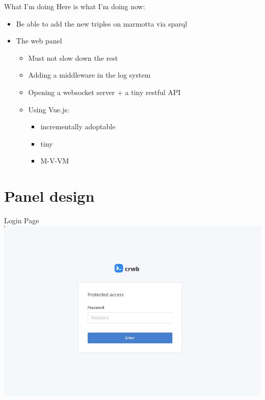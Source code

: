 \documentclass[10pt]{beamer}
\begin{document}
\begin{frame}{What I'm doing}
    Here is what I'm doing now:
    \begin{itemize}
        \item Be able to add the new triples on marmotta via sparql
        \item The web panel
        \begin{itemize}
            \item Must not slow down the rest
            \item Adding a middleware in the log system
            \item Opening a websocket server + a tiny restful API
            \item Using Vue.js:
            \begin{itemize}
                \item incrementally adoptable
                \item tiny
                \item M-V-VM
            \end{itemize}
        \end{itemize}
    \end{itemize}
\end{frame}

\section{Panel design}

\begin{frame}{Login Page}
    \includegraphics[width=11 cm]{login.png}
\end{frame}
\end{document}
